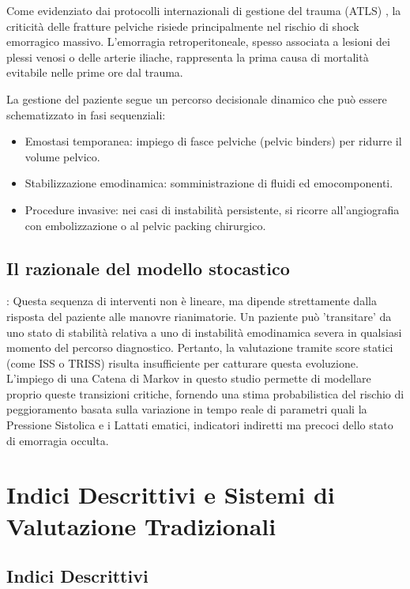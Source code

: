 \documentclass[11pt, oneside, noexaminfo]{sapthesis}   	%
\begin{document}
Come evidenziato dai protocolli internazionali di gestione del trauma (ATLS) \cite{atls2018}, la criticità delle fratture pelviche risiede principalmente nel rischio di shock emorragico massivo. L'emorragia retroperitoneale, spesso associata a lesioni dei plessi venosi o delle arterie iliache, rappresenta la prima causa di mortalità evitabile nelle prime ore dal trauma.

La gestione del paziente segue un percorso decisionale dinamico che può essere schematizzato in fasi sequenziali:
\begin{itemize}

	\item Emostasi temporanea: impiego di fasce pelviche (pelvic binders) per ridurre il volume pelvico.

	\item Stabilizzazione emodinamica: somministrazione di fluidi ed emocomponenti.

	\item Procedure invasive: nei casi di instabilità persistente, si ricorre all'angiografia con embolizzazione o al pelvic packing chirurgico.
\end{itemize}

\subsection{Il razionale del modello stocastico}:
Questa sequenza di interventi non è lineare, ma dipende strettamente dalla risposta del paziente alle manovre rianimatorie. Un paziente può 'transitare' da uno stato di stabilità relativa a uno di instabilità emodinamica severa in qualsiasi momento del percorso diagnostico. Pertanto, la valutazione tramite score statici (come ISS o TRISS) risulta insufficiente per catturare questa evoluzione. L'impiego di una Catena di Markov in questo studio permette di modellare proprio queste transizioni critiche, fornendo una stima probabilistica del rischio di peggioramento basata sulla variazione in tempo reale di parametri quali la Pressione Sistolica e i Lattati ematici, indicatori indiretti ma precoci dello stato di emorragia occulta.

\section{Indici Descrittivi e Sistemi di Valutazione Tradizionali}
\subsection{Indici Descrittivi}
\end{document}
